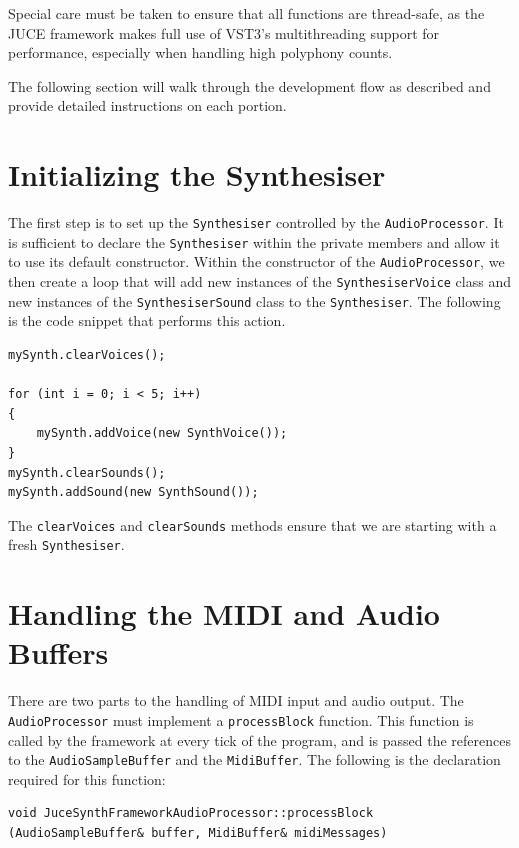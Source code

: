 \documentclass[a4paper,12pt]{report}
\begin{document}
Special care must be taken to ensure that all functions are thread-safe, as the JUCE framework makes full use of VST3's multithreading support for performance, especially when handling high polyphony counts.

The following section will walk through the development flow as described and provide detailed instructions on each portion.

\section{Initializing the Synthesiser}
\label{sec:initializesynthesizer}
The first step is to set up the \texttt{Synthesiser} controlled by the \texttt{AudioProcessor}. It is sufficient to declare the \texttt{Synthesiser} within the private members and allow it to use its default constructor. 
Within the constructor of the \texttt{AudioProcessor}, we then create a loop that will add new instances of the \texttt{SynthesiserVoice} class and new instances of the \texttt{SynthesiserSound} class to the \texttt{Synthesiser}. The following is the code snippet that performs this action.

 \noindent\begin{minipage}{\linewidth} \begin{lstlisting}[caption={Instantiating Voices},label={code:instantiatingvoices},captionpos=b]
mySynth.clearVoices();
    
for (int i = 0; i < 5; i++)
{
    mySynth.addVoice(new SynthVoice());
}
mySynth.clearSounds();
mySynth.addSound(new SynthSound());
\end{lstlisting}
\end{minipage}

The \texttt{clearVoices} and \texttt{clearSounds} methods ensure that we are starting with a fresh \texttt{Synthesiser}.

\section{Handling the MIDI and Audio Buffers}
\label{sec:handlingbuffers}
There are two parts to the handling of MIDI input and audio output. The \texttt{AudioProcessor} must implement a \texttt{processBlock} function. This function is called by the framework at every tick of the program, and is passed the references to the \texttt{AudioSampleBuffer} and the \texttt{MidiBuffer}. The following is the declaration required for this function:

 \noindent\begin{minipage}{\linewidth} \begin{lstlisting}[caption={processBlock Declaration},label={code:processblockdeclaration},captionpos=b]
void JuceSynthFrameworkAudioProcessor::processBlock (AudioSampleBuffer& buffer, MidiBuffer& midiMessages)
\end{lstlisting} \end{minipage}
\end{document}
